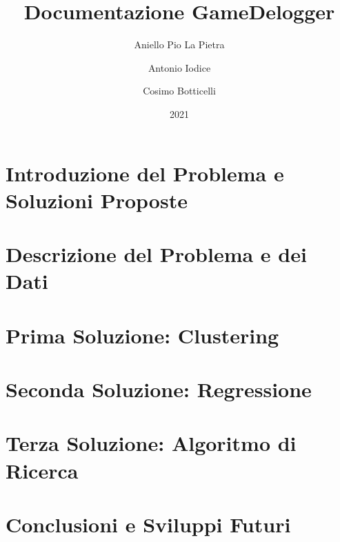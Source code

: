 \documentclass[12pt]{report}
\title{Documentazione GameDelogger}
\author{Aniello Pio La Pietra \and Antonio Iodice \and Cosimo Botticelli}
\date{2021}
\begin{document}
\maketitle
\tableofcontents


\chapter{Introduzione del Problema e Soluzioni Proposte}


\chapter{Descrizione del Problema e dei Dati}


\chapter{Prima Soluzione: Clustering}


\chapter{Seconda Soluzione: Regressione}


\chapter{Terza Soluzione: Algoritmo di Ricerca}


\chapter{Conclusioni e Sviluppi Futuri}

\end{document}

